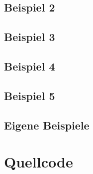 \documentclass[a4paper, notitlepage, 12pt]{scrartcl}
\begin{document}
\subsection{Beispiel 2}
\subsection{Beispiel 3}
\subsection{Beispiel 4}
\subsection{Beispiel 5}
\subsection{Eigene Beispiele}

 \section{Quellcode}
 \renewcommand{\listingscaption}{Quellcode}
 
 
\end{document}
